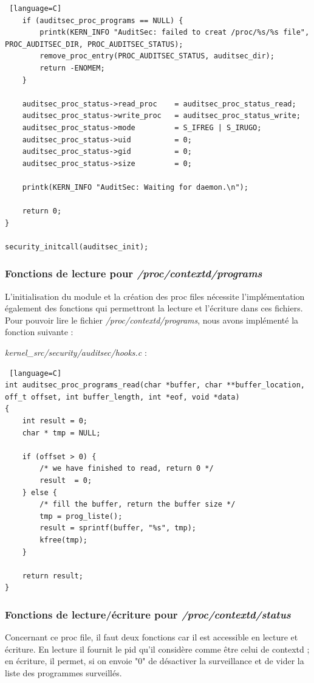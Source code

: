 \documentclass[pdftex,a4paper,titlepage,11pt]{article}
\begin{document}
\begin{lstlisting} [language=C]
	if (auditsec_proc_programs == NULL) {
		printk(KERN_INFO "AuditSec: failed to creat /proc/%s/%s file", PROC_AUDITSEC_DIR, PROC_AUDITSEC_STATUS);
		remove_proc_entry(PROC_AUDITSEC_STATUS, auditsec_dir);
		return -ENOMEM;
	}

	auditsec_proc_status->read_proc    = auditsec_proc_status_read;
	auditsec_proc_status->write_proc   = auditsec_proc_status_write;
	auditsec_proc_status->mode         = S_IFREG | S_IRUGO;
	auditsec_proc_status->uid          = 0;
	auditsec_proc_status->gid          = 0;
	auditsec_proc_status->size         = 0;

	printk(KERN_INFO "AuditSec: Waiting for daemon.\n");

	return 0;
}

security_initcall(auditsec_init);
\end{lstlisting}

\subsubsection{Fonctions de lecture pour \textit{/proc/contextd/programs}}

L'initialisation du module et la création des proc files nécessite l'implémentation également des fonctions qui permettront la lecture et l'écriture dans ces fichiers. Pour pouvoir lire le fichier \textit{/proc/contextd/programs}, nous avons implémenté la fonction suivante :

\textit{{kernel\_src}/security/auditsec/hooks.c} :
\begin{lstlisting} [language=C]
int auditsec_proc_programs_read(char *buffer, char **buffer_location,  off_t offset, int buffer_length, int *eof, void *data)
{
	int result = 0;
	char * tmp = NULL;
	
	if (offset > 0) {
		/* we have finished to read, return 0 */
		result  = 0;
	} else {
		/* fill the buffer, return the buffer size */
		tmp = prog_liste();
		result = sprintf(buffer, "%s", tmp);
		kfree(tmp);
	}

	return result;
}
\end{lstlisting}

\subsubsection{Fonctions de lecture/écriture pour \textit{/proc/contextd/status}}

Concernant ce proc file, il faut deux fonctions car il est accessible en lecture et écriture. En lecture il fournit le pid qu'il considère comme être celui de contextd ; en écriture, il permet, si on envoie "0" de désactiver la surveillance et de vider la liste des programmes surveillés.
\end{document}
